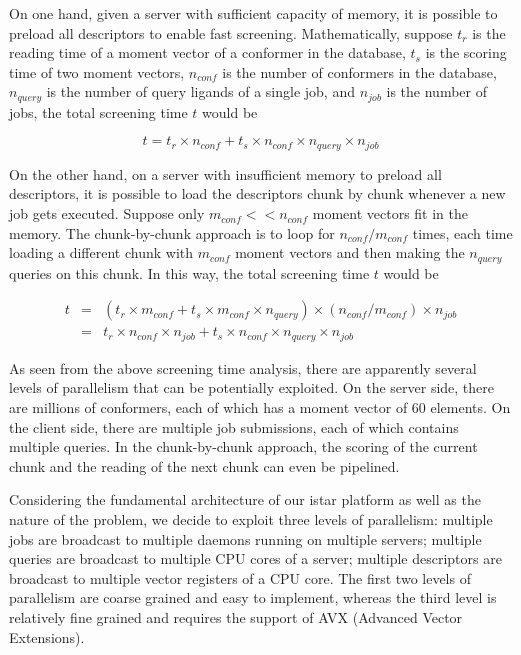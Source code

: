 On one hand, given a server with sufficient capacity of memory, it is possible to preload all descriptors to enable fast screening. Mathematically, suppose $t_r$ is the reading time of a moment vector of a conformer in the database, $t_s$ is the scoring time of two moment vectors, $n_{conf}$ is the number of conformers in the database, $n_{query}$ is the number of query ligands of a single job, and $n_{job}$ is the number of jobs, the total screening time $t$ would be

\begin{equation}
t=t_r\times n_{conf}+t_s\times n_{conf}\times n_{query}\times n_{job}
\label{usr:time0}
\end{equation}

On the other hand, on a server with insufficient memory to preload all descriptors, it is possible to load the descriptors chunk by chunk whenever a new job gets executed. Suppose only $m_{conf} << n_{conf}$ moment vectors fit in the memory. The chunk-by-chunk approach is to loop for $n_{conf}/m_{conf}$ times, each time loading a different chunk with $m_{conf}$ moment vectors and then making the $n_{query}$ queries on this chunk. In this way, the total screening time $t$ would be

\begin{eqnarray}
t&=&(t_r\times m_{conf}+t_s\times m_{conf}\times n_{query})\times(n_{conf}/m_{conf})\times n_{job}\nonumber\\
 &=&t_r\times n_{conf}\times n_{job}+t_s\times n_{conf}\times n_{query}\times n_{job}
\label{usr:time1}
\end{eqnarray}

As seen from the above screening time analysis, there are apparently several levels of parallelism that can be potentially exploited. On the server side, there are millions of conformers, each of which has a moment vector of 60 elements. On the client side, there are multiple job submissions, each of which contains multiple queries. In the chunk-by-chunk approach, the scoring of the current chunk and the reading of the next chunk can even be pipelined.

Considering the fundamental architecture of our istar platform \citep{1362} as well as the nature of the problem, we decide to exploit three levels of parallelism: multiple jobs are broadcast to multiple daemons running on multiple servers; multiple queries are broadcast to multiple CPU cores of a server; multiple descriptors are broadcast to multiple vector registers of a CPU core. The first two levels of parallelism are coarse grained and easy to implement, whereas the third level is relatively fine grained and requires the support of AVX (Advanced Vector Extensions).

